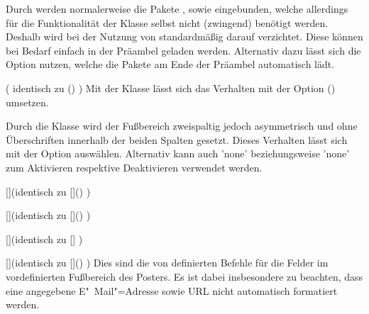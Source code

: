 \begin{Entity'}{}
\begin{Declaration}{}
\printdeclarationlist%
%
Durch  werden normalerweise die Pakete , 
 sowie  eingebunden, welche allerdings für 
die Funktionalität der Klasse selbst nicht (zwingend) benötigt werden. Deshalb 
wird bei der Nutzung von  standardmäßig darauf verzichtet. 
Diese können bei Bedarf einfach in der Präambel geladen werden. Alternativ 
dazu 
lässt sich die Option  nutzen, welche die Pakete am Ende 
der Präambel automatisch lädt.
\end{Declaration}

\begin{Declaration}{}(%
  identisch zu ()%
)
\printdeclarationlist%
%
Mit der Klasse  lässt sich das Verhalten mit der Option 
() umsetzen.
\end{Declaration}

\begin{Declaration}{}%
\printdeclarationlist%
%
Durch die Klasse  wird der Fußbereich zweispaltig jedoch 
asymmetrisch und ohne Überschriften innerhalb der beiden Spalten gesetzt. 
Dieses Verhalten lässt sich mit der Option  auswählen. 
Alternativ kann auch 'none' beziehungsweise 
'none' zum Aktivieren respektive Deaktivieren 
verwendet werden.
\end{Declaration}

\begin{Declaration}{[]}(identisch zu 
  []()%
)
\begin{Declaration}{[]}(identisch zu 
  []()%
)
\begin{Declaration}{[]}(identisch zu 
  []%
)
\begin{Declaration}{[]}(identisch zu 
  []()%
)
\printdeclarationlist%
%
Dies sind die von  definierten Befehle für die Felder im 
vordefinierten Fußbereich des Posters. Es ist dabei insbesondere zu beachten, 
dass eine angegebene E"~Mail"=Adresse sowie URL nicht automatisch formatiert 
werden.
\end{Declaration}
\end{Declaration}
\end{Declaration}
\end{Declaration}


\end{Entity'}
